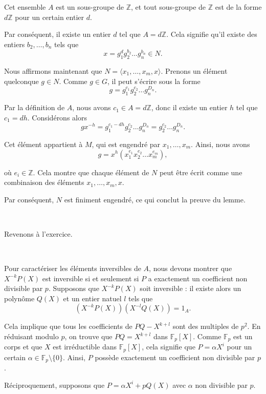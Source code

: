 Cet ensemble $A$ est un sous-groupe de $\mathbb{Z}$, et tout sous-groupe de
$\mathbb{Z}$ est de la forme $d\mathbb{Z}$ pour un certain entier $d$.

Par cons{\'e}quent, il existe un entier $d$ tel que $A = d\mathbb{Z}$. Cela
signifie qu'il existe des entiers $b_2, \ldots, b_n$ tels que
\[ x = g_1^d g_2^{b_2} \ldots g_n^{b_n} \in N. \]


Nous affirmons maintenant que $N = \langle x_1, \ldots, x_m, x \rangle$.
Prenons un {\'e}l{\'e}ment quelconque $g \in N$. Comme $g \in G$, il peut
s'{\'e}crire sous la forme
\[ g = g_1^{c_1} g_2^{c_2} \ldots g_n^{D_n} . \]


Par la d{\'e}finition de $A$, nous avons $c_1 \in A = d\mathbb{Z}$, donc il
existe un entier $h$ tel que $c_1 = dh$. Consid{\'e}rons alors
\[ gx^{- h} = g_1^{c_1 - dh} g_2^{c_2} \ldots g_n^{D_n} = g_2^{c_2} \ldots
   g_n^{D_n} . \]


Cet {\'e}l{\'e}ment appartient {\`a} $M$, qui est engendr{\'e} par $x_1,
\ldots, x_m$. Ainsi, nous avons
\[ g = x^h (x_1^{e_1} x_2^{e_2} \ldots x_m^{e_m}), \]


o{\`u} $e_i \in \mathbb{Z}$. Cela montre que chaque {\'e}l{\'e}ment de $N$
peut {\^e}tre {\'e}crit comme une combinaison des {\'e}l{\'e}ments $x_1,
\ldots, x_m, x$.

Par cons{\'e}quent, $N$ est finiment engendr{\'e}, ce qui conclut la preuve du
lemme.

\

Revenons {\`a} l'exercice.

\

Pour caract{\'e}riser les {\'e}l{\'e}ments inversibles de $A$, nous devons
montrer que $X^{- k} P (X)$ est inversible si et seulement si $P$ a exactement
un coefficient non divisible par $p$. Supposons que $X^{- k} P (X)$ soit
inversible : il existe alors un polyn{\^o}me $Q (X)$ et un entier natuel $l$
tels que
\[ (X^{- k} P (X)) (X^{- l} Q (X)) = 1_A . \]


Cela implique que tous les coefficients de $PQ - X^{k + l}$ sont des multiples
de $p^2$. En r{\'e}duisant modulo $p$, on trouve que $PQ = X^{k + l}$ dans
$\mathbb{F}_p [X]$. Comme $\mathbb{F}_p$ est un corps et que $X$ est
irr{\'e}ductible dans $\mathbb{F}_p [X]$, cela signifie que $P = \alpha X^i$
pour un certain $\alpha \in \mathbb{F}_p \setminus \{0\}$. Ainsi, $P$
poss{\`e}de exactement un coefficient non divisible par $p$.

R{\'e}ciproquement, supposons que $P = \alpha X^i + pQ (X)$ avec $\alpha$ non
divisible par $p$.

